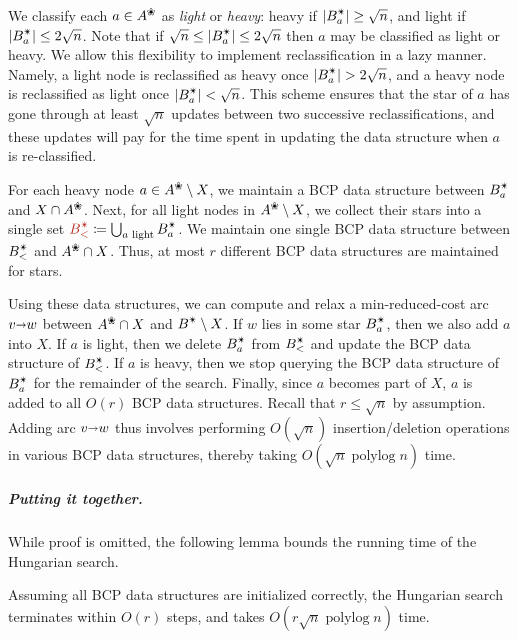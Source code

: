 \documentclass[a4paper,UKenglish,nolineno]{socg-lipics-v2019}
\def\polylog{\mathop{\mathrm{polylog}}}
\def\abs#1{\mathopen| #1 \mathclose|}		%
\def\arcto{\mathord\shortrightarrow}
\def\arc#1#2{#1\arcto#2}
\def\alive#1{{#1}^\text{\ding{96}}}
\def\star{\text{\ding{84}}}
\def\EMPH#1{\textcolor{BrickRed}{{\emph{#1}}}}
\begin{document}
We classify each $a \in \alive{A}$ as \EMPH{light} or \EMPH{heavy}:
heavy if $\abs{B_a^\star} \geq \sqrt{n}$,
and light if $\abs{B_a^\star} \leq 2\sqrt{n}$.
Note that if $\sqrt{n} \leq \abs{B_a^\star} \leq 2\sqrt{n}$ then $a$ may be classified
as light or heavy.
We allow this flexibility to implement reclassification in a lazy manner.
Namely, a light node is reclassified as heavy once $\abs{B_a^\star} > 2\sqrt{n}$,
and a heavy node is reclassified as light once $\abs{B_a^\star} < \sqrt{n}$.
This scheme ensures that the star of $a$ has gone through at least $\sqrt{n}$
updates between two successive reclassifications,
and these updates will pay for the time spent in updating the data structure
when $a$ is re-classified.

For each heavy node $a \in \alive{A} \setminus X$, we maintain a BCP data
structure between $B_a^\star$ and $X \cap \alive{A}$.
Next, for all light nodes in $\alive{A} \setminus X$, we collect their stars into
a single set $\EMPH{$B_<^\star$} \coloneqq \bigcup_{\text{$a$ light}} B_a^\star$.
We maintain one single BCP data structure between $B_<^\star$ and $\alive{A} \cap X$.
Thus, at most $r$ different BCP data structures are maintained for stars.

Using these data structures, we can compute and relax a min-reduced-cost arc $\arc vw$ between
$\alive{A} \cap X$ and $B^\star \setminus X$.
If $w$ lies in some star $B_a^\star$, then we also add $a$ into $X$.
If $a$ is light, then we delete $B_a^\star$ from $B_<^\star$ and update the BCP data structure of $B_<^\star$.
If $a$ is heavy, then we stop querying the BCP data structure of $B_a^\star$ for the
remainder of the search.
Finally, since $a$ becomes part of $X$, $a$ is added to all $O(r)$ BCP data structures.
%
Recall that $r \leq \sqrt{n}$ by assumption.
Adding arc $\arc vw$ thus involves performing $O(\sqrt{n})$
insertion/deletion operations in various BCP data structures, thereby taking
$O(\sqrt{n}\polylog n)$ time.

\subparagraph{Putting it together.}
While proof is omitted, the following lemma bounds the running time of the
Hungarian search.

\begin{lemma}
Assuming all BCP data structures are initialized correctly, the Hungarian search
terminates within $O(r)$ steps, and takes $O(r\sqrt{n}\polylog n)$ time.
\end{lemma}
\end{document}
